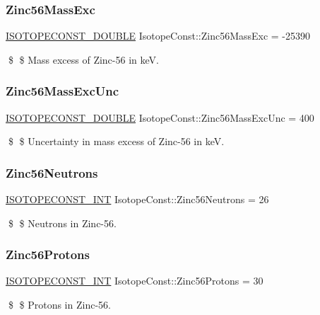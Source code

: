 \subsubsection{\texorpdfstring{Zinc56\+Mass\+Exc}{Zinc56MassExc}}
{\footnotesize\ttfamily \mbox{\hyperlink{group___isotope_const-_macros_ga8f45a7272ce02c0b4c65c44636ed719a}{I\+S\+O\+T\+O\+P\+E\+C\+O\+N\+S\+T\+\_\+\+D\+O\+U\+B\+LE}} Isotope\+Const\+::\+Zinc56\+Mass\+Exc = -\/25390}

\$ \$ Mass excess of Zinc-\/56 in keV. \mbox{\label{group___isotope_const-_zinc-_zn56_gacbbb944f19a329639e73bb31bad26c17}} 
\subsubsection{\texorpdfstring{Zinc56\+Mass\+Exc\+Unc}{Zinc56MassExcUnc}}
{\footnotesize\ttfamily \mbox{\hyperlink{group___isotope_const-_macros_ga8f45a7272ce02c0b4c65c44636ed719a}{I\+S\+O\+T\+O\+P\+E\+C\+O\+N\+S\+T\+\_\+\+D\+O\+U\+B\+LE}} Isotope\+Const\+::\+Zinc56\+Mass\+Exc\+Unc = 400}

\$ \$ Uncertainty in mass excess of Zinc-\/56 in keV. \mbox{\label{group___isotope_const-_zinc-_zn56_ga4fa489739e592c26a79c1e68566d116a}} 
\subsubsection{\texorpdfstring{Zinc56\+Neutrons}{Zinc56Neutrons}}
{\footnotesize\ttfamily \mbox{\hyperlink{group___isotope_const-_macros_ga5f18360b3e99483a35c32d789e62621c}{I\+S\+O\+T\+O\+P\+E\+C\+O\+N\+S\+T\+\_\+\+I\+NT}} Isotope\+Const\+::\+Zinc56\+Neutrons = 26}

\$ \$ Neutrons in Zinc-\/56. \mbox{\label{group___isotope_const-_zinc-_zn56_ga5550698ec38852f999f9315f40fce747}} 
\subsubsection{\texorpdfstring{Zinc56\+Protons}{Zinc56Protons}}
{\footnotesize\ttfamily \mbox{\hyperlink{group___isotope_const-_macros_ga5f18360b3e99483a35c32d789e62621c}{I\+S\+O\+T\+O\+P\+E\+C\+O\+N\+S\+T\+\_\+\+I\+NT}} Isotope\+Const\+::\+Zinc56\+Protons = 30}

\$ \$ Protons in Zinc-\/56. 